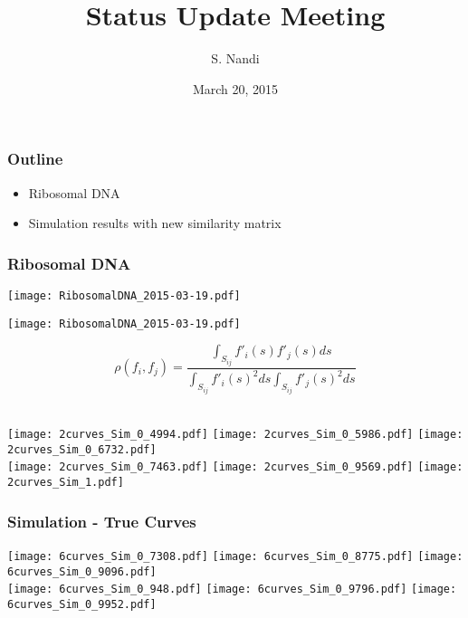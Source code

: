 \documentclass[10pt,dvipsnames,table]{beamer}
\title[Status Update Mar '15]{Status Update Meeting}
\author{S. Nandi}
\institute[LMCG]{LMCG \\
 University of Wisconsin-Madison}
\date{March 20, 2015}
\begin{document}
\setlength{\baselineskip}{16truept}
\frame{\maketitle}

\begin{frame}
\frametitle{Outline}
\begin{itemize}       
\item Ribosomal DNA 
\item Simulation results with new similarity matrix
\end{itemize}
\end{frame}

\begin{frame}
\frametitle{Ribosomal DNA}
\begin{center}
\texttt{[image: RibosomalDNA\_2015-03-19.pdf]} 
\end{center}
\end{frame}

\begin{frame}
\begin{center}
\texttt{[image: RibosomalDNA\_2015-03-19.pdf]} 
\end{center}
\end{frame}

\begin{frame}
\[ \rho(f_i, f_j) = \frac{\int _{S_{ij}}f'_i(s)f'_j(s) ds}{\int _{S_{ij}}f'_i(s)^2 ds \int _{S_{ij}}f'_j(s)^2 ds} \] \\
\begin{center}
\texttt{[image: 2curves\_Sim\_0\_4994.pdf]}
\texttt{[image: 2curves\_Sim\_0\_5986.pdf]}
\texttt{[image: 2curves\_Sim\_0\_6732.pdf]} \\
\texttt{[image: 2curves\_Sim\_0\_7463.pdf]}
\texttt{[image: 2curves\_Sim\_0\_9569.pdf]}
\texttt{[image: 2curves\_Sim\_1.pdf]}
\end{center}
\end{frame}

\begin{frame}
\frametitle{Simulation - True Curves}
\begin{center}
\texttt{[image: 6curves\_Sim\_0\_7308.pdf]}
\texttt{[image: 6curves\_Sim\_0\_8775.pdf]}
\texttt{[image: 6curves\_Sim\_0\_9096.pdf]} \\
\texttt{[image: 6curves\_Sim\_0\_948.pdf]}
\texttt{[image: 6curves\_Sim\_0\_9796.pdf]}
\texttt{[image: 6curves\_Sim\_0\_9952.pdf]}
\end{center}
\end{frame}
\end{document}
